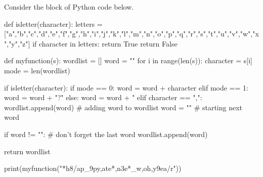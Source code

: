 \documentclass[addpoints,a4]{exam} %
\begin{document}
\begin{questions}


\clearpage
{} Consider the block of Python code below.
\begin{python}
def isletter(character):
    letters = ["a","b","c","d","e","f","g","h","i","j","k","l","m","n","o","p","q","r","s","t","u","v","w","x","y","z"]
    if character in letters:
        return True 
    return False

def myfunction(s):
    wordlist = []
    word = ""
    for i in range(len(s)): 
        character = s[i]
        mode = len(wordlist) %
    
        if isletter(character):
            if mode == 0: 
                word = word + character
            elif mode == 1:
                word = word + "?" 
            else:
                word = word + "%
        elif character == ",":
            wordlist.append(word) # adding word to wordlist
            word = "" # starting next word

    if word != "":  # don't forget the last word
        wordlist.append(word)
    
    return wordlist

print(myfunction("*h8/ap_9py,ate*,n3e*_w,oh,y9ea/r"))
\end{python}
\end{questions}
\end{document}
